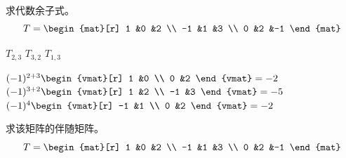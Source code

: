 \begin{exercises}
  \recommended \item 
    求代数余子式。
    \begin{equation*}
      T=\begin{mat}[r]
           1  &0  &2  \\
          -1  &1  &3  \\
           0  &2  &-1
         \end{mat}
    \end{equation*}
    \begin{exparts*}
       \partsitem \( T_{2,3} \)
       \partsitem \( T_{3,2} \)
       \partsitem \( T_{1,3} \)
    \end{exparts*}
    \begin{answer}
      \begin{exparts*}
       \partsitem \( (-1)^{2+3}\begin{vmat}[r]
                            1  &0  \\
                            0  &2
                          \end{vmat}=-2  \)
       \partsitem \( (-1)^{3+2}\begin{vmat}[r]
                            1  &2  \\
                           -1  &3
                          \end{vmat}=-5  \)
       \partsitem \( (-1)^{4}\begin{vmat}[r]
                           -1  &1  \\
                            0  &2
                          \end{vmat}=-2  \)
      \end{exparts*}  
    \end{answer}
  \recommended \item 
    求该矩阵的伴随矩阵。
    \begin{equation*}
      T=\begin{mat}[r]
           1  &0  &2  \\
          -1  &1  &3  \\
           0  &2  &-1
         \end{mat}
    \end{equation*}
    \begin{answer}
      {\renewcommand{\arraystretch}{1.2}
      \begin{equation*} 

\end{equation*}}
\end{answer}
\end{exercises}
